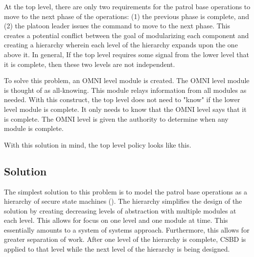 \documentclass[../../main/main.tex]{subfiles}
\begin{document}
At the top level, there are only two requirements for the patrol base operations to move to the next phase of the operations: (1) the previous phase is complete, and (2) the platoon leader issues the command to move to the next phase.  This creates a potential conflict between the goal of modularizing each component and creating a hierarchy wherein each level of the hierarchy expands upon the one above it.  In general, If the top level requires some signal from the lower level that it is complete, then these two levels are not independent. 

To solve this problem, an OMNI level module is created.  The OMNI level module is thought of as all-knowing.  This module relays information from all modules as needed.  With this construct, the top level does not need to "know" if the lower level module is complete.  It only needs to know that the OMNI level says that it is complete.  The OMNI level is given the authority to determine when any module is complete.

With this solution in mind, the top level policy looks like this.



\subsection{Solution}
The simplest solution to this problem is to model the patrol base operations as a hierarchy of secure state machines ().  The hierarchy simplifies the design of the solution by creating decreasing levels of abstraction with multiple modules at each level.  This allows for focus on one level and one module at time. This essentially amounts to a system of systems approach.  Furthermore, this allows for greater separation of work.  After one level of the hierarchy is complete, CSBD is applied to that level while the next level of the hierarchy is being designed.
\end{document}
